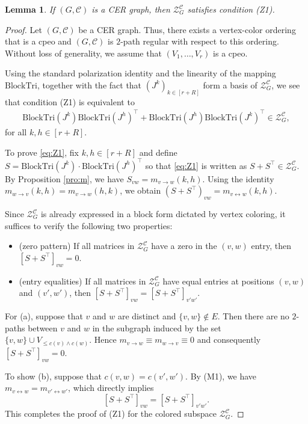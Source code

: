\documentclass[12pt]{amsart}
\theoremstyle{plain}
\newtheorem{lemma}[theorem]{Lemma}
\theoremstyle{definition}
\theoremstyle{remark}
\newcommand{\1}{\mathbf{1}}
\newcommand{\coloredZ}{\mathcal{Z}_{G}^{\mathcal{C}}}
\newcommand{\tri}{\mathrm{BlockTri}}
\begin{document}
\begin{lemma}\label{lem:Z1}
If \((G,\mathcal{C})\) is a CER graph, then $\coloredZ$ satisfies condition (Z1). 
\end{lemma}
\begin{proof}
Let \((G,\mathcal{C})\) be a CER graph. Thus, there exists a vertex-color ordering that is a cpeo and $(G,\mathcal{C})$ is $2$-path regular with respect to this ordering. Without loss of generality, we assume that $(V_{1},\ldots,V_r)$ is a cpeo.

Using the standard polarization identity and the linearity of the mapping $\tri$, together with the fact that $(J^k)_{k\in[r+R]}$ form a basis of $\coloredZ$, we see that condition (Z1) is equivalent to   
\begin{align}\label{eq:Z1}
\tri\left(J^k\right)\tri\left(J^h\right)^\top + \tri\left(J^h\right)\tri\left(J^k\right)^\top\in\coloredZ,
\end{align}
for all $k,h\in [r+R]$.

To prove \eqref{eq:Z1}, fix $k,h\in [r+R]$ and define $S = \tri(J^k)\cdot\tri(J^h)^\top$ so that \eqref{eq:Z1} is written as $S+S^\top\in\coloredZ$.  By Proposition \ref{pro:m}, we have $S_{vw} = m_{v\to w}(k,h)$.
 Using the identity $m_{w\to v}(k,h) = m_{v\to w}(h,k)$, we obtain  
 $(S+S^\top)_{vw} = m_{v\leftrightarrow w}(k,h)$. 
 
 Since $\coloredZ$ is already expressed in a block form dictated by vertex coloring, it suffices to verify the following two properties:
\begin{itemize}
    \item[(a)] (zero pattern) If all matrices in $\coloredZ$ have a zero in the $(v,w)$ entry, then \linebreak\mbox{$\left[S + S^\top\right]_{vw} = 0$}.
    \item[(b)] (entry equalities) If all matrices in $\coloredZ$ have equal entries at positions $(v,w)$ and $(v',w')$, then $[S + S^\top]_{vw} = [S + S^\top]_{v'w'}$.
\end{itemize}

For (a), suppose that $v$ and $w$ are distinct and $\{v,w\}\notin E$. Then there are no $2$-paths between $v$ and $w$ in the subgraph induced by the set $\{v,w\}\cup V_{\leq c(v)\wedge c(w)}$. Hence $m_{v\to w}\equiv m_{w\to v}\equiv 0$ and consequently $[S+S^\top]_{vw} = 0$. 

To show (b), suppose that $c(v,w) = c(v',w')$. 
By (M1), we have $m_{v\leftrightarrow w} = m_{v'\leftrightarrow w'}$, which directly implies
\[
[S+S^\top]_{vw} = [S+S^\top]_{v'w'}. 
\]
This completes the proof of (Z1) for the colored subspace $\coloredZ$.
\end{proof}
\end{document}
